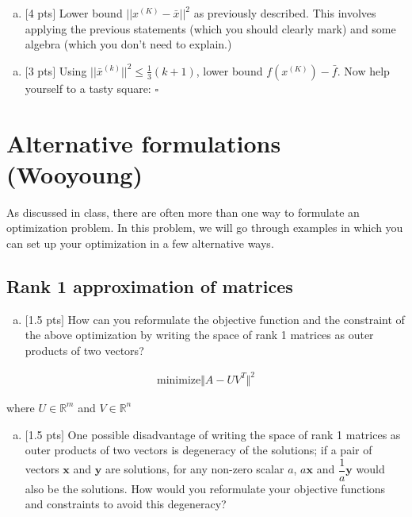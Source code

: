\documentclass[12pt]{article}
\begin{document}
 \begin{enumerate}[(g)]
 \item $[$4 pts$]$ Lower bound $||x^{(K)} - \bar{x}||^2$ as previously described. This involves applying the previous statements (which you should clearly mark) and some algebra (which you don't need to explain.)
  \end{enumerate}
 \vspace{.25cm}
 
 \begin{enumerate}[(h)]
 \item $[$3 pts$]$ Using $||\bar{x}^{(k)}||^2 \leq \frac{1}{3}(k+1)$, lower bound $f(x^{(K)}) - \bar{f}$. Now help yourself to a tasty square: \hfill$\square$ 
 \end{enumerate}
 \vspace{.25cm}

\newpage
\clearpage

\section{ Alternative formulations (Wooyoung)}

As discussed in class, there are often more than one way to formulate an optimization problem. In this problem, we will go through examples in which you can set up your optimization in a few alternative ways.

\subsection{Rank 1 approximation of matrices }
 
\begin{enumerate}[(a)]
\item 
$[$1.5 pts$]$ How can you reformulate the objective function and the constraint of the above optimization by writing the space of rank 1 matrices as outer products of two vectors?
\end{enumerate}
\vspace{.25cm}

\begin{align*}
\text{minimize} \Vert A-UV^T \Vert^{2}
\end{align*}

where $U \in \mathbb{R}^{m}$ and $V \in \mathbb{R}^{n}$

\begin{enumerate}[(b)]
\item
$[$1.5 pts$]$ One possible disadvantage of writing the space of rank 1 matrices as outer products of two vectors is degeneracy of the solutions; if a pair of vectors $\mathbf{x}$ and $\mathbf{y}$ are solutions, for any non-zero scalar $a$, $a\mathbf{x}$ and $\dfrac{1}{a}\mathbf{y}$ would also be the solutions. How would you reformulate your objective functions and constraints to avoid this degeneracy?
\end{enumerate}
\vspace{.25cm}
\end{document}
